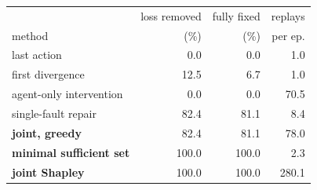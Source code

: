 \begin{tabular}{lrrr}
\toprule
& loss removed & fully fixed & replays \\
method & (\%) & (\%) & per ep. \\
\midrule
last action & 0.0 & 0.0 & 1.0 \\
first divergence & 12.5 & 6.7 & 1.0 \\
agent-only intervention & 0.0 & 0.0 & 70.5 \\
single-fault repair & 82.4 & 81.1 & 8.4 \\
\bfseries joint, greedy & 82.4 & 81.1 & 78.0 \\
\bfseries minimal sufficient set & 100.0 & 100.0 & 2.3 \\
\bfseries joint Shapley & 100.0 & 100.0 & 280.1 \\
\bottomrule
\end{tabular}